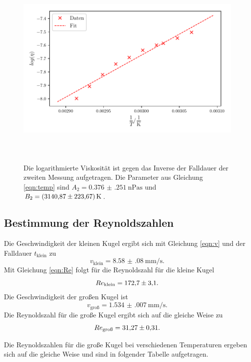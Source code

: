 \begin{figure}
    \centering
    \includegraphics[width=14cm, height=10cm]{build/plot2.pdf}
    \caption{Die logarithmierte Viskosität ist gegen das Inverse
    der Falldauer der zweiten Messung aufgetragen. Die Parameter
    aus Gleichung \eqref{eqn:temp} sind $A_2=\SI{0.376(251)}{\nano\pascal\second}$
    und $B_2=\SI{3140.87 \pm 223.67}{\kelvin}$.}
    \label{fig:plot2}
\end{figure}

\subsection{Bestimmung der Reynoldszahlen}
Die Geschwindigkeit der kleinen Kugel ergibt sich mit Gleichung \eqref{eqn:v}
und der Falldauer $t_\text{klein}$ zu
\begin{equation*}
    v_\text{klein} = \SI{8.58(08)}{\milli\meter\per\second}.
\end{equation*}
Mit Gleichung \eqref{eqn:Re} folgt für die Reynoldszahl für die kleine Kugel
\begin{equation*}
    Re_\text{klein} = \num{172.7 \pm 3.1}.
\end{equation*}
Die Geschwindigkeit der großen Kugel ist
\begin{equation*}
    v_\text{groß} = \SI{1.534(007)}{\milli\meter\per\second}.
\end{equation*}
Die Reynoldszahl für die große Kugel ergibt sich auf die gleiche Weise zu
\begin{equation*}
    Re_\text{groß} = \num{31.27 \pm 0.31}.
\end{equation*}

\noindent Die Reynoldszahlen für die große Kugel bei verschiedenen Temperaturen ergeben sich auf die gleiche Weise und sind in folgender Tabelle aufgetragen. 


